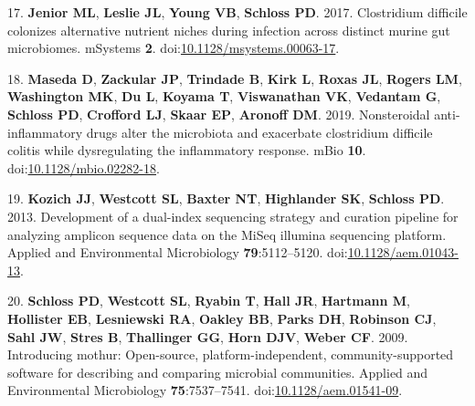 \documentclass[11pt,]{article}
\begin{document}
\hypertarget{ref-Jenior2017}{}
17. \textbf{Jenior ML}, \textbf{Leslie JL}, \textbf{Young VB},
\textbf{Schloss PD}. 2017. Clostridium difficile colonizes alternative
nutrient niches during infection across distinct murine gut microbiomes.
mSystems \textbf{2}.
doi:\href{https://doi.org/10.1128/msystems.00063-17}{10.1128/msystems.00063-17}.

\hypertarget{ref-Maseda2019}{}
18. \textbf{Maseda D}, \textbf{Zackular JP}, \textbf{Trindade B},
\textbf{Kirk L}, \textbf{Roxas JL}, \textbf{Rogers LM},
\textbf{Washington MK}, \textbf{Du L}, \textbf{Koyama T},
\textbf{Viswanathan VK}, \textbf{Vedantam G}, \textbf{Schloss PD},
\textbf{Crofford LJ}, \textbf{Skaar EP}, \textbf{Aronoff DM}. 2019.
Nonsteroidal anti-inflammatory drugs alter the microbiota and exacerbate
clostridium difficile colitis while dysregulating the inflammatory
response. mBio \textbf{10}.
doi:\href{https://doi.org/10.1128/mbio.02282-18}{10.1128/mbio.02282-18}.

\hypertarget{ref-Kozich2013}{}
19. \textbf{Kozich JJ}, \textbf{Westcott SL}, \textbf{Baxter NT},
\textbf{Highlander SK}, \textbf{Schloss PD}. 2013. Development of a
dual-index sequencing strategy and curation pipeline for analyzing
amplicon sequence data on the MiSeq illumina sequencing platform.
Applied and Environmental Microbiology \textbf{79}:5112--5120.
doi:\href{https://doi.org/10.1128/aem.01043-13}{10.1128/aem.01043-13}.

\hypertarget{ref-Schloss2009}{}
20. \textbf{Schloss PD}, \textbf{Westcott SL}, \textbf{Ryabin T},
\textbf{Hall JR}, \textbf{Hartmann M}, \textbf{Hollister EB},
\textbf{Lesniewski RA}, \textbf{Oakley BB}, \textbf{Parks DH},
\textbf{Robinson CJ}, \textbf{Sahl JW}, \textbf{Stres B},
\textbf{Thallinger GG}, \textbf{Horn DJV}, \textbf{Weber CF}. 2009.
Introducing mothur: Open-source, platform-independent,
community-supported software for describing and comparing microbial
communities. Applied and Environmental Microbiology
\textbf{75}:7537--7541.
doi:\href{https://doi.org/10.1128/aem.01541-09}{10.1128/aem.01541-09}.
\end{document}
